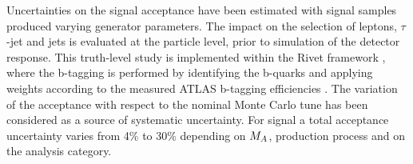 Uncertainties on the signal acceptance have been estimated with signal 
samples produced  varying generator parameters. The impact on the selection
 of leptons, $\tau$-jet  and jets is evaluated at the particle level, prior to 
simulation of the detector response. This truth-level study is implemented within the Rivet framework
\cite{RIVET}, where the b-tagging is performed by identifying the b-quarks and applying
 weights according to the measured ATLAS b-tagging
efficiencies \cite{BtaggingScaleFactors}. The variation of the acceptance
with respect to the nominal Monte Carlo tune has  been considered as
a source of systematic uncertainty. For signal a total acceptance 
uncertainty varies from 4\% to 30\% depending on $M_{A}$, production process 
and on the analysis category.

 

